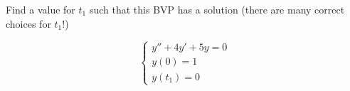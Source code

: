 \begin{enumerate}
\begin{minipage}{12cm}
Find a value for $t_1$ such that this BVP has a solution (there are many correct choices for $t_1$!)
\end{minipage}
\hfill
\begin{minipage}{5cm}
\[
\begin{cases}
y'' + 4y' + 5y = 0\\
y(0) = 1\\
y(t_1) = 0
\end{cases}
\]
\end{minipage}

\end{enumerate}